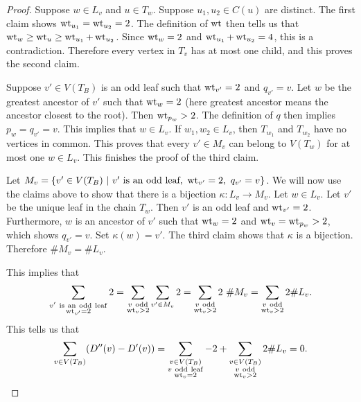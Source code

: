 \begin{proof}
Suppose $w \in L_v$ and $u \in T_w$. Suppose $u_1,u_2 \in C(u)$ are distinct. The first claim shows $\operatorname{wt}_{u_1} = \operatorname{wt}_{u_2} = 2$. The definition of $\operatorname{wt}$ then tells us that $\operatorname{wt}_w \geq \operatorname{wt}_u \geq \operatorname{wt}_{u_1}+\operatorname{wt}_{u_2}$. Since $\operatorname{wt}_w = 2$ and $\operatorname{wt}_{u_1}+\operatorname{wt}_{u_2} = 4$, this is a contradiction. Therefore every vertex in $T_v$ has at most one child, and this proves the second claim.

Suppose $v' \in V(T_B)$ is an odd leaf such that $\operatorname{wt}_{v'} = 2$ and $q_{v'} = v$. Let $w$ be the greatest ancestor of $v'$ such that $\operatorname{wt}_w = 2$ (here greatest ancestor means the ancestor closest to the root). Then $\operatorname{wt}_{p_w} > 2$. The definition of $q$ then implies $p_w = q_{v'} = v$. This implies that $w \in L_v$. If $w_1,w_2 \in L_v$, then $T_{w_1}$ and $T_{w_2}$ have no vertices in common. This proves that every $v' \in M_v$ can belong to $V(T_w)$ for at most one $w \in L_v$. This finishes the proof of the third claim.

Let $M_v = \{ v' \in V(T_B) \ | \ \textup{$v'$ is an odd leaf},\ \wt_{v'} = 2,\ q_{v'} = v  \}$. We will now use the claims above to show that there is a bijection $\kappa \colon L_v \rightarrow M_v$. Let $w \in L_v$. Let $v'$ be the unique leaf in the chain $T_w$. Then $v'$ is an odd leaf and $\operatorname{wt}_{v'} = 2$. Furthermore, $w$ is an ancestor of $v'$ such that $\operatorname{wt}_{w} = 2$ and $\operatorname{wt}_v= \operatorname{wt}_{p_w} > 2$, which shows $q_{v'} = v$. Set $\kappa(w) = v'$. The third claim shows that $\kappa$ is a bijection. Therefore $\# M_v = \# L_v$.

This implies that
\[ \sum_{\substack{v' \ \mathrm{is \ an \ odd \ leaf} \\ \wt_{v'} = 2}} 2 = \sum_{\substack{v \ \mathrm{odd} \\ \wt_v > 2}} \sum_{v' \in M_v} 2 = \sum_{\substack{v \ \mathrm{odd} \\ \wt_v > 2}} 2 \ \#M_v = \sum_{\substack{v \ \mathrm{odd} \\ \wt_v > 2}} 2 \#L_v .\]
This tells us that
\[ \sum_{v \in V(T_B)}( D''(v) - D'(v) ) = \sum_{\substack{v \in V(T_B) \\ v \ \mathrm{odd \ leaf} \\ \operatorname{wt}_v = 2}} -2 + \sum_{\substack{v \in V(T_B) \\ v \ \mathrm{odd} \\ \operatorname{wt}_v > 2}} 2\# L_v = 0. \qedhere \]
\end{proof}

